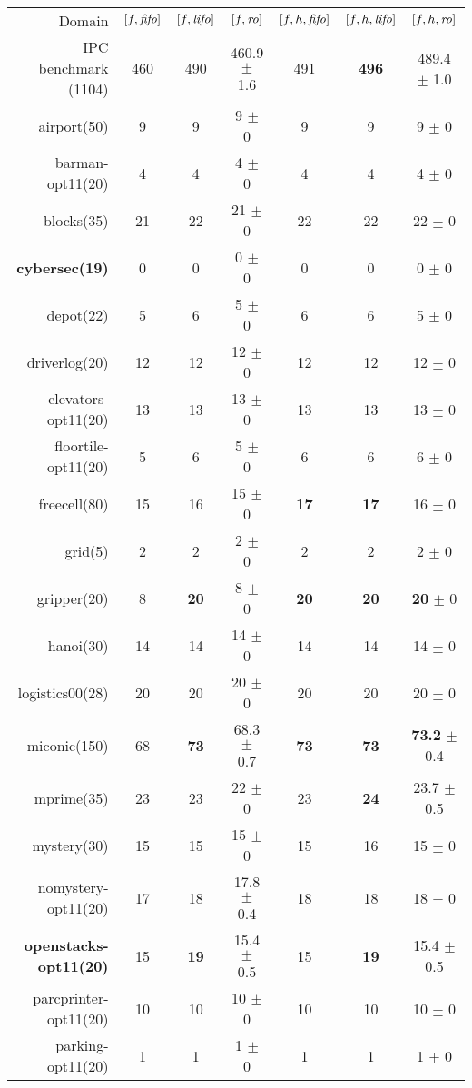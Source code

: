 \begin{center}
\begin{tabular}{|r|*{2}{ccc|}}
Domain & \([f,{\text{\textit{fifo}}}]\) & \([f,{\text{\textit{lifo}}}]\) & \([f,{\text{\textit{ro}}}]\) & \([f,h,{\text{\textit{fifo}}}]\) & \([f,h,{\text{\textit{lifo}}}]\) & \([f,h,{\text{\textit{ro}}}]\)\\
IPC benchmark (1104) & 460 & 490 & 460.9 \(\pm\) 1.6 & 491 & \textbf{496} & 489.4 \(\pm\) 1.0\\
airport(50) & 9 & 9 & 9 \(\pm\) 0 & 9 & 9 & 9 \(\pm\) 0\\
barman-opt11(20) & 4 & 4 & 4 \(\pm\) 0 & 4 & 4 & 4 \(\pm\) 0\\
blocks(35) & 21 & 22 & 21 \(\pm\) 0 & 22 & 22 & 22 \(\pm\) 0\\
\textbf{cybersec(19)} & 0 & 0 & 0 \(\pm\) 0 & 0 & 0 & 0 \(\pm\) 0\\
depot(22) & 5 & 6 & 5 \(\pm\) 0 & 6 & 6 & 5 \(\pm\) 0\\
driverlog(20) & 12 & 12 & 12 \(\pm\) 0 & 12 & 12 & 12 \(\pm\) 0\\
elevators-opt11(20) & 13 & 13 & 13 \(\pm\) 0 & 13 & 13 & 13 \(\pm\) 0\\
floortile-opt11(20) & 5 & 6 & 5 \(\pm\) 0 & 6 & 6 & 6 \(\pm\) 0\\
freecell(80) & 15 & 16 & 15 \(\pm\) 0 & \textbf{17} & \textbf{17} & 16 \(\pm\) 0\\
grid(5) & 2 & 2 & 2 \(\pm\) 0 & 2 & 2 & 2 \(\pm\) 0\\
gripper(20) & 8 & \textbf{20} & 8 \(\pm\) 0 & \textbf{20} & \textbf{20} & \textbf{20} \(\pm\) 0\\
hanoi(30) & 14 & 14 & 14 \(\pm\) 0 & 14 & 14 & 14 \(\pm\) 0\\
logistics00(28) & 20 & 20 & 20 \(\pm\) 0 & 20 & 20 & 20 \(\pm\) 0\\
miconic(150) & 68 & \textbf{73} & 68.3 \(\pm\) 0.7 & \textbf{73} & \textbf{73} & \textbf{73.2} \(\pm\) 0.4\\
mprime(35) & 23 & 23 & 22 \(\pm\) 0 & 23 & \textbf{24} & 23.7 \(\pm\) 0.5\\
mystery(30) & 15 & 15 & 15 \(\pm\) 0 & 15 & 16 & 15 \(\pm\) 0\\
nomystery-opt11(20) & 17 & 18 & 17.8 \(\pm\) 0.4 & 18 & 18 & 18 \(\pm\) 0\\
\textbf{openstacks-opt11(20)} & 15 & \textbf{19} & 15.4 \(\pm\) 0.5 & 15 & \textbf{19} & 15.4 \(\pm\) 0.5\\
parcprinter-opt11(20) & 10 & 10 & 10 \(\pm\) 0 & 10 & 10 & 10 \(\pm\) 0\\
parking-opt11(20) & 1 & 1 & 1 \(\pm\) 0 & 1 & 1 & 1 \(\pm\) 0\\

\end{tabular}
\end{center}
